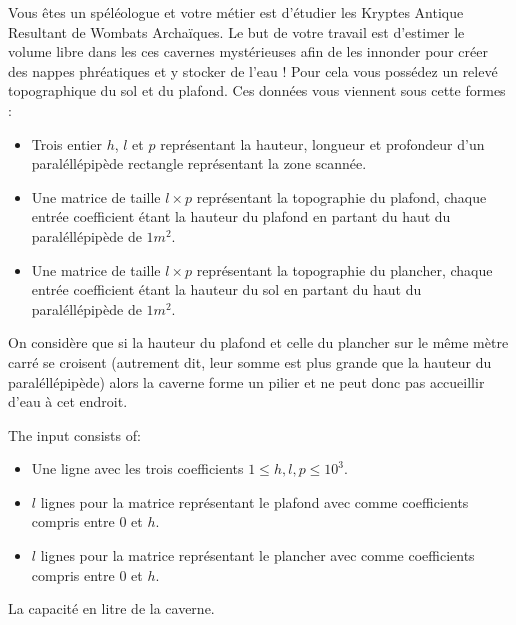 

\newcommand{\maxa}{123456789}

Vous êtes un spéléologue et votre métier est d'étudier les Kryptes Antique Resultant de Wombats Archaïques. Le but de votre travail est d'estimer le volume libre dans les ces cavernes mystérieuses afin de les innonder pour créer des nappes phréatiques et y stocker de l'eau ! Pour cela vous possédez un relevé topographique du sol et du plafond. Ces données vous viennent sous cette formes :
\begin{itemize}
\item Trois entier $h$, $l$ et $p$ représentant la hauteur, longueur et profondeur d'un paraléllépipède rectangle représentant la zone scannée.
\item Une matrice de taille $l\times p$ représentant la topographie du plafond, chaque entrée coefficient étant la hauteur du plafond en partant du haut du paraléllépipède de $1m^2$.
\item Une matrice de taille $l\times p$ représentant la topographie du plancher, chaque entrée coefficient étant la hauteur du sol en partant du haut du paraléllépipède de $1m^2$.
\end{itemize}

On considère que si la hauteur du plafond et celle du plancher sur le même mètre carré se croisent (autrement dit, leur somme est plus grande que la hauteur du paraléllépipède) alors la caverne forme un pilier et ne peut donc pas accueillir d'eau à cet endroit.

\begin{Input}
    The input consists of:
    \begin{itemize}
        \item Une ligne avec les trois coefficients $1 \leq h, l, p \leq 10^3$.
        \item $l$ lignes pour la matrice représentant le plafond avec comme coefficients compris entre $0$ et $h$.
        \item $l$ lignes pour la matrice représentant le plancher avec comme coefficients compris entre $0$ et $h$.
    \end{itemize}
\end{Input}

\begin{Output}
    La capacité en litre de la caverne.
\end{Output}
